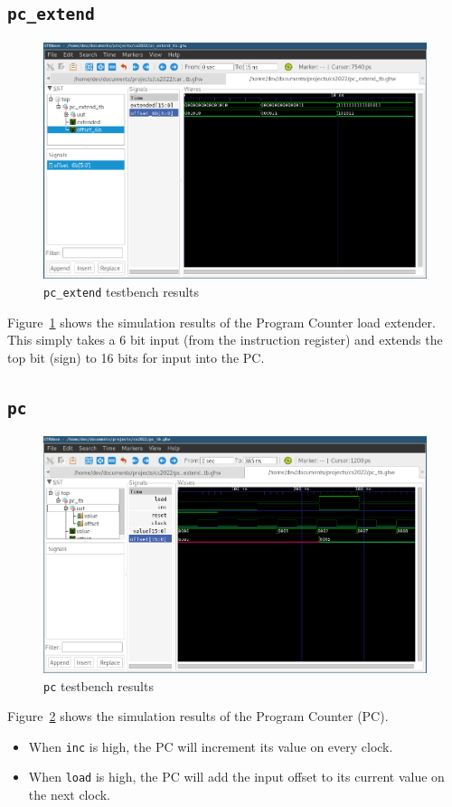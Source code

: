 \documentclass[a4paper]{article}
\numberwithin{figure}{section}
\numberwithin{table}{section}
\newcommand{\mi}{\mintinline}
\begin{document}
\newpage
\subsection{\mi{c}{pc_extend}}
\begin{figure}[h!]
	\centering
	\includegraphics[width=\textwidth]{pc_extend_tb}
	\caption{\mi{c}{pc_extend} testbench results}
	\label{fig:pcext}
\end{figure}

Figure~\ref{fig:pcext} shows the simulation results of the Program Counter load extender.
This simply takes a 6 bit input (from the instruction register) and extends the top bit (sign) to 16 bits for 
input into the PC.

\newpage
\subsection{\mi{c}{pc}}
\begin{figure}[h!]
	\centering
	\includegraphics[width=\textwidth]{pc_tb}
	\caption{\mi{c}{pc} testbench results}
	\label{fig:pc}
\end{figure}

Figure~\ref{fig:pc} shows the simulation results of the Program Counter (PC).
\begin{itemize}
	\item When \mi{c}{inc} is high, the PC will increment its value on every clock.
	\item When \mi{c}{load} is high, the PC will add the input offset to its current value on the next clock.
\end{itemize}
\end{document}
